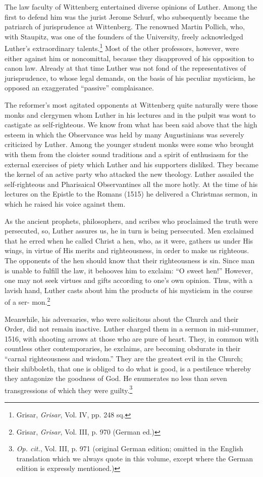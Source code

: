 The law faculty of Wittenberg entertained diverse opinions of
Luther. Among the first to defend him was the jurist Jerome Schurf,
who subsequently became the patriarch of jurisprudence at Wittenberg. The
renowned Martin Pollich, who, with Staupitz, was one of
the founders of the University, freely acknowledged Luther’s extraordinary
talents.\footnote{Grisar, \textit{Grisar}, Vol. IV, pp. 248 sq.}
Most of the other professors, however, were either
against him or noncomittal, because they disapproved of his opposition
to canon law. Already at that time Luther was not fond
of the representatives of jurisprudence, to whose legal demands, on
the basis of his peculiar mysticism, he opposed an exaggerated “passive” complaisance.

The reformer’s most agitated opponents at Wittenberg quite naturally
were those monks and clergymen whom Luther in his lectures
and in the pulpit was wont to castigate as self-righteous. We know
from what has been said above that the high esteem in which the
Observance was held by many Augustinians was severely criticized
by Luther. Among the younger student monks were some who brought
with them from the cloister sound traditions and a spirit of enthusiasm
for the external exercises of piety which Luther and his supporters
disliked. They became the kernel of an active party who attacked the
new theology. Luther assailed the self-righteous and Pharisaical Observantines
all the more hotly. At the time of his lectures on the
Epistle to the Romans (1515) he delivered a Christmas sermon, in
which he raised his voice against them.

As the ancient prophets, philosophers, and scribes who proclaimed the
truth were persecuted, so, Luther assures us, he in turn is being persecuted.
Men exclaimed that he erred when he called Christ a hen, who, as it were,
gathers us under His wings, in virtue of His merits and righteousness, in
order to make us righteous. The opponents of the hen should know that
their righteousness is sin. Since man is unable to fulfill the law, it behooves
him to exclaim: “O sweet hen!” However, one may not seek virtues and
gifts according to one’s own opinion. Thus, with a lavish hand, Luther
casts about him the products of his mysticism in the course of a ser-
mon.\footnote{Grisar, \textit{Grisar}, Vol. III, p. 970 (German ed.)}

Meanwhile, his adversaries, who were solicitous about the Church and
their Order, did not remain inactive. Luther charged them in a sermon in
mid-summer, 1516, with shooting arrows at those who are pure of heart.
They, in common with countless other contemporaries, he exclaims, are
becoming obdurate in their “carnal righteousness and wisdom.” They are
the greatest evil in the Church; their shibboleth, that one is obliged to
do what is good, is a pestilence whereby they antagonize the goodness of
God. He enumerates no less than seven transgressions of which they were
guilty.\footnote
{\textit{Op. cit.}, Vol. III, p. 971 (original German edition; omitted in the English translation
which we always quote in this volume, except where the German edition is expressly
mentioned.)}

